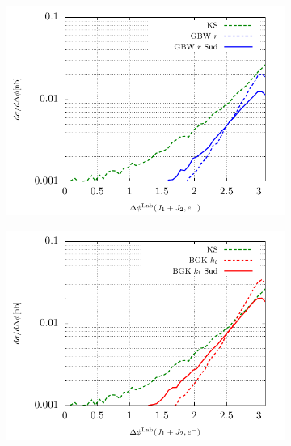 \documentclass[a4,12pt]{article}
\begin{document}
\begin{figure}[p]
\begin{subfigure}{0.5\textwidth}
	\end{subfigure}
	\begin{subfigure}{0.5\textwidth}
		\includegraphics[width=\textwidth]{gnuplot/plotGBW3Lab}
	\end{subfigure}
	\begin{subfigure}{0.5\textwidth}
		\includegraphics[width=\textwidth]{gnuplot/plotBGK2Lab}
	\end{subfigure}
	\begin{subfigure}{0.5\textwidth}

\end{subfigure}
\end{figure}
\end{document}
